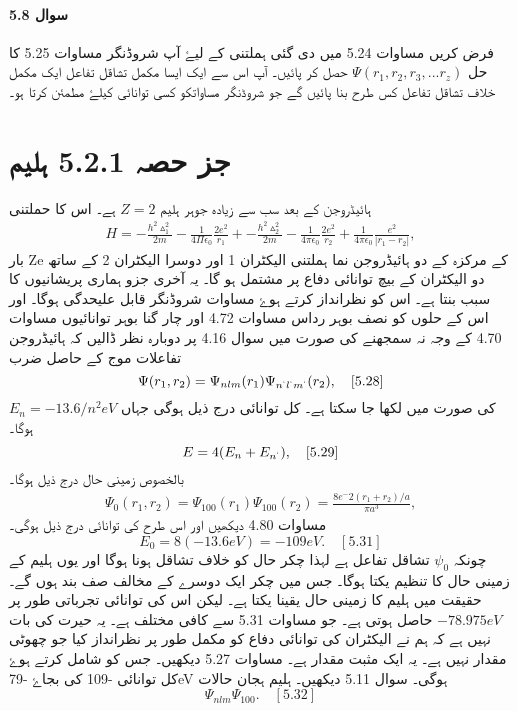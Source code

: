 \paragraph*{سوال 5.8}
فرض کریں مساوات 5.24 میں دی گئی ہملتنی کے لیۓ آپ شروڈنگر مساوات 5.25 کا حل $ \Psi(r_{1} , r_{2}, r_{3},...r_{z}) $ حصل کر پائیں۔ آپ اس سے ایک ایسا مکمل تشاقل تفاعل ایک مکمل خلاف تشاقل تفاعل کس طرح بنا پائیں گے جو شروڈنگر مساواتکو کسی توانائی کیلۓ مطمئن کرتا ہو۔
\section*{جز حصہ 5.2.1 ہلیم} 
ہائیڈروجن کے بعد سب سے زیادہ جوہر ہلیم $ Z=2 $ ہے۔ اس کا حملتنی
\begin{align}
H= { -\frac{h^2 \vartriangle^2 _{1}}{2m} -\frac{1}{4\Pi\epsilon_{0}} \frac{2e^2}{r_{1}}} + { -\frac{h^2 \vartriangle^2 _{2}}{2m}-\frac{1}{4 \pi \epsilon_{0}} \frac{2e^2}{r_{2}}}+ \frac{1}{4 \pi \epsilon_{0}}\frac{e^2}{|r_{1} -r_{2}|},
\end{align}
بار Ze کے مرکزہ کے دو ہائیڈروجن نما ہملتنی الیکٹران 1 اور دوسرا الیکٹران 2 کے ساتھ دو الیکٹران کے بیچ توانائی دفاع پر مشتمل ہو گا۔ یہ آخری جزو ہماری پریشانیوں کا سبب بنتا ہے۔ اس کو نظرانداز کرتے ہوۓ مساوات شروڈنگر قابل علیحدگی ہوگا۔ اور اس کے حلوں کو نصف بوہر رداس مساوات 4.72 اور چار گنا بوہر توانائیوں مساوات 4.70 کے وجہ نہ سمجھنے کی صورت میں سوال 4.16 پر دوبارہ نظر ڈالیں کہ ہائیڈروجن تفاعلات موج کے حاصل ضرب 
$$ \Psi(r_{1}, r_{2})= \Psi_{nlm} (r_{1}) \Psi_{n^{`} l^{`} m^{`}} (r_{2}), \quad [5.28] $$
کی صورت میں لکھا جا سکتا ہے۔ کل توانائی درج ذیل ہوگی جہاں $ E_{n}=-13.6/n^2 eV $ ہوگا۔
$$ E= 4(E_{n} +E_{n^{`}}), \quad [5.29] $$
بالخصوص زمینی حال درج ذیل ہوگا۔
\begin{align}
\Psi_{0}(r_{1}, r_{2})=\Psi_{100}(r_{1}) \Psi_{100}(r_{2})=\frac{8e^-2(r_{1} + r_{2})/a}{\pi a^3},
\end{align}
مساوات 4.80 دیکھیں اور اس طرح کی توانائی درج ذیل ہوگی۔
$$ E_{0}=8(-13.6eV)=-109 eV . \quad [5.31] $$
چونکہ $ \psi_{0} $ تشاقل تفاعل ہے لہذا چکر حال کو خلاف تشاقل ہونا ہوگا اور یوں ہلیم کے زمینی حال کا تنظیم یکتا ہوگا۔ جس میں چکر ایک دوسرے کے مخالف صف بند ہوں گے۔ حقیقت میں ہلیم کا زمینی حال یقینا یکتا ہے۔ لیکن اس کی توانائی تجرباتی طور پر $ -78.975eV $ حاصل ہوتی ہے۔ جو مساوات 5.31 سے کافی مختلف ہے۔ یہ حیرت کی بات نہیں ہے کہ ہم نے الیکٹران کی توانائی دفاع کو مکمل طور پر نظرانداز کیا جو چھوٹی مقدار نہیں ہے۔ یہ ایک مثبت مقدار ہے۔ مساوات 5.27 دیکھیں۔ جس کو شامل کرتے ہوۓ کل توانائی  -109 کی بجاۓ -79eV ہوگی۔ سوال 5.11 دیکھیں۔ ہلیم ہجان حالات 
$$ \Psi_{nlm} \Psi_{100} . \quad [5.32] $$
